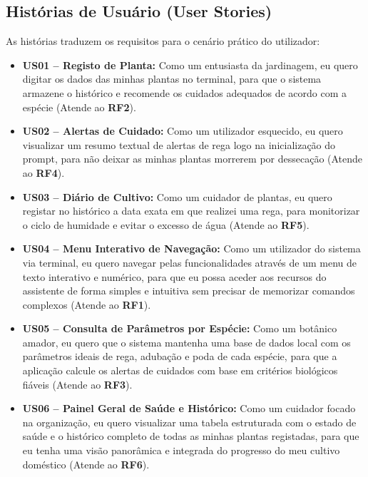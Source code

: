 \documentclass[a4paper,12pt]{article}
\begin{document}
\subsection{Histórias de Usuário (User Stories)}
As histórias traduzem os requisitos para o cenário prático do utilizador:
\begin{itemize}[leftmargin=*]
    \item \textbf{US01 -- Registo de Planta:} Como um entusiasta da jardinagem, eu quero digitar os dados das minhas plantas no terminal, para que o sistema armazene o histórico e recomende os cuidados adequados de acordo com a espécie (Atende ao \textbf{RF2}).
    \item \textbf{US02 -- Alertas de Cuidado:} Como um utilizador esquecido, eu quero visualizar um resumo textual de alertas de rega logo na inicialização do prompt, para não deixar as minhas plantas morrerem por dessecação (Atende ao \textbf{RF4}).
    \item \textbf{US03 -- Diário de Cultivo:} Como um cuidador de plantas, eu quero registar no histórico a data exata em que realizei uma rega, para monitorizar o ciclo de humidade e evitar o excesso de água (Atende ao \textbf{RF5}).
    \item \textbf{US04 -- Menu Interativo de Navegação:} Como um utilizador do sistema via terminal, eu quero navegar pelas funcionalidades através de um menu de texto interativo e numérico, para que eu possa aceder aos recursos do assistente de forma simples e intuitiva sem precisar de memorizar comandos complexos (Atende ao \textbf{RF1}).
    \item \textbf{US05 -- Consulta de Parâmetros por Espécie:} Como um botânico amador, eu quero que o sistema mantenha uma base de dados local com os parâmetros ideais de rega, adubação e poda de cada espécie, para que a aplicação calcule os alertas de cuidados com base em critérios biológicos fiáveis (Atende ao \textbf{RF3}).
    \item \textbf{US06 -- Painel Geral de Saúde e Histórico:} Como um cuidador focado na organização, eu quero visualizar uma tabela estruturada com o estado de saúde e o histórico completo de todas as minhas plantas registadas, para que eu tenha uma visão panorâmica e integrada do progresso do meu cultivo doméstico (Atende ao \textbf{RF6}).
\end{itemize}

\vspace{2em}

\end{document}

